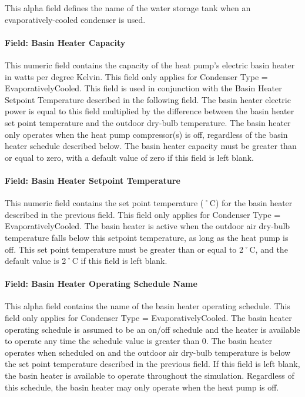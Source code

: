 This alpha field defines the name of the water storage tank when an evaporatively-cooled condenser is used.

\paragraph{Field: Basin Heater Capacity}\label{field-basin-heater-capacity-004}

This numeric field contains the capacity of the heat pump's electric basin heater in watts per degree Kelvin. This field only applies for Condenser Type = EvaporativelyCooled. This field is used in conjunction with the Basin Heater Setpoint Temperature described in the following field. The basin heater electric power is equal to this field multiplied by the difference between the basin heater set point temperature and the outdoor dry-bulb temperature. The basin heater only operates when the heat pump compressor(s) is off, regardless of the basin heater schedule described below. The basin heater capacity must be greater than or equal to zero, with a default value of zero if this field is left blank.

\paragraph{Field: Basin Heater Setpoint Temperature}\label{field-basin-heater-setpoint-temperature-004}

This numeric field contains the set point temperature (˚C) for the basin heater described in the previous field. This field only applies for Condenser Type = EvaporativelyCooled. The basin heater is active when the outdoor air dry-bulb temperature falls below this setpoint temperature, as long as the heat pump is off. This set point temperature must be greater than or equal to 2˚C, and the default value is 2˚C if this field is left blank.

\paragraph{Field: Basin Heater Operating Schedule Name}\label{field-basin-heater-operating-schedule-name-003}

This alpha field contains the name of the basin heater operating schedule. This field only applies for Condenser Type = EvaporativelyCooled. The basin heater operating schedule is assumed to be an on/off schedule and the heater is available to operate any time the schedule value is greater than 0. The basin heater operates when scheduled on and the outdoor air dry-bulb temperature is below the set point temperature described in the previous field. If this field is left blank, the basin heater is available to operate throughout the simulation. Regardless of this schedule, the basin heater may only operate when the heat pump is off.

